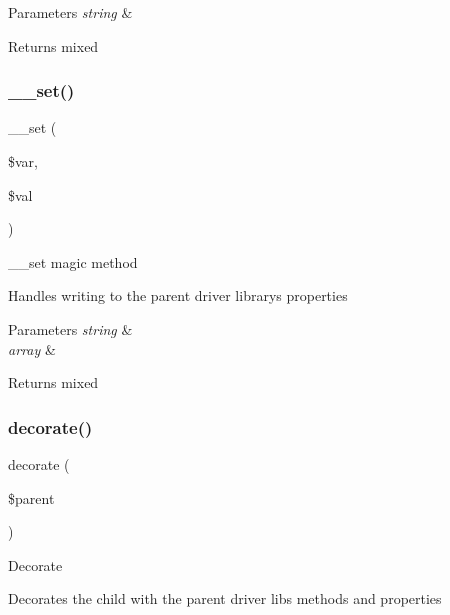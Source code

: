 \begin{DoxyParams}{Parameters}
{\em string} & \\
\hline
\end{DoxyParams}
\begin{DoxyReturn}{Returns}
mixed 
\end{DoxyReturn}
\mbox{\label{class_c_i___driver_a921783e9d7c3fb79479375193c9f3d1e}} 
\subsubsection{\texorpdfstring{\+\_\+\+\_\+set()}{\_\_set()}}
{\footnotesize\ttfamily \+\_\+\+\_\+set (\begin{DoxyParamCaption}\item[{}]{\$var,  }\item[{}]{\$val }\end{DoxyParamCaption})}

\+\_\+\+\_\+set magic method

Handles writing to the parent driver library\textquotesingle{}s properties


\begin{DoxyParams}{Parameters}
{\em string} & \\
\hline
{\em array} & \\
\hline
\end{DoxyParams}
\begin{DoxyReturn}{Returns}
mixed 
\end{DoxyReturn}
\mbox{\label{class_c_i___driver_acf6a5ad6a84d4c7a27f463cbb618004b}} 
\subsubsection{\texorpdfstring{decorate()}{decorate()}}
{\footnotesize\ttfamily decorate (\begin{DoxyParamCaption}\item[{}]{\$parent }\end{DoxyParamCaption})}

Decorate

Decorates the child with the parent driver lib\textquotesingle{}s methods and properties


